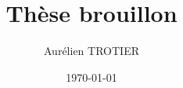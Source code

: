 \documentclass[a4paper,twoside]{memoir}
\begin{document}
\title{Thèse brouillon}
\author{Aurélien TROTIER}
\date{\today}
\maketitle

%

%
%
%
%
%



\end{document}
